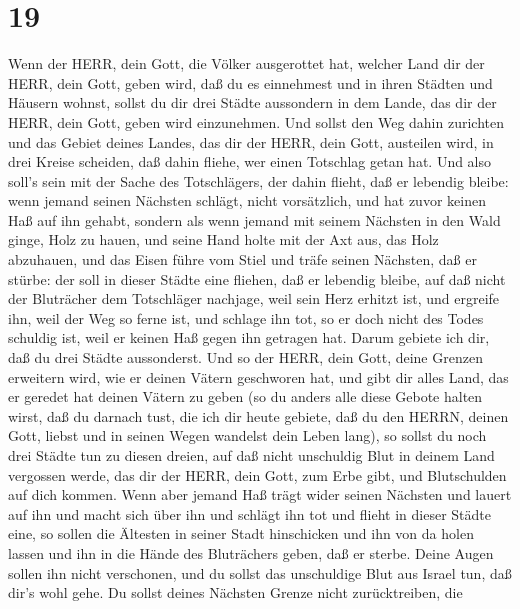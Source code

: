 \hypertarget{section-18}{%
\section{19}\label{section-18}}

 Wenn der HERR, dein Gott, die Völker ausgerottet hat,
welcher Land dir der HERR, dein Gott, geben wird, daß du es einnehmest
und in ihren Städten und Häusern wohnst,  sollst du dir drei
Städte aussondern in dem Lande, das dir der HERR, dein Gott, geben wird
einzunehmen.  Und sollst den Weg dahin zurichten und das
Gebiet deines Landes, das dir der HERR, dein Gott, austeilen wird, in
drei Kreise scheiden, daß dahin fliehe, wer einen Totschlag getan hat.
 Und also soll's sein mit der Sache des Totschlägers, der
dahin flieht, daß er lebendig bleibe: wenn jemand seinen Nächsten
schlägt, nicht vorsätzlich, und hat zuvor keinen Haß auf ihn gehabt,
 sondern als wenn jemand mit seinem Nächsten in den Wald
ginge, Holz zu hauen, und seine Hand holte mit der Axt aus, das Holz
abzuhauen, und das Eisen führe vom Stiel und träfe seinen Nächsten, daß
er stürbe: der soll in dieser Städte eine fliehen, daß er lebendig
bleibe,  auf daß nicht der Bluträcher dem Totschläger
nachjage, weil sein Herz erhitzt ist, und ergreife ihn, weil der Weg so
ferne ist, und schlage ihn tot, so er doch nicht des Todes schuldig ist,
weil er keinen Haß gegen ihn getragen hat.  Darum gebiete
ich dir, daß du drei Städte aussonderst.  Und so der HERR,
dein Gott, deine Grenzen erweitern wird, wie er deinen Vätern geschworen
hat, und gibt dir alles Land, das er geredet hat deinen Vätern zu geben
 (so du anders alle diese Gebote halten wirst, daß du
darnach tust, die ich dir heute gebiete, daß du den HERRN, deinen Gott,
liebst und in seinen Wegen wandelst dein Leben lang), so sollst du noch
drei Städte tun zu diesen dreien,  auf daß nicht unschuldig
Blut in deinem Land vergossen werde, das dir der HERR, dein Gott, zum
Erbe gibt, und Blutschulden auf dich kommen.  Wenn aber
jemand Haß trägt wider seinen Nächsten und lauert auf ihn und macht sich
über ihn und schlägt ihn tot und flieht in dieser Städte eine,
 so sollen die Ältesten in seiner Stadt hinschicken und ihn
von da holen lassen und ihn in die Hände des Bluträchers geben, daß er
sterbe.  Deine Augen sollen ihn nicht verschonen, und du
sollst das unschuldige Blut aus Israel tun, daß dir's wohl gehe.
 Du sollst deines Nächsten Grenze nicht zurücktreiben, die
